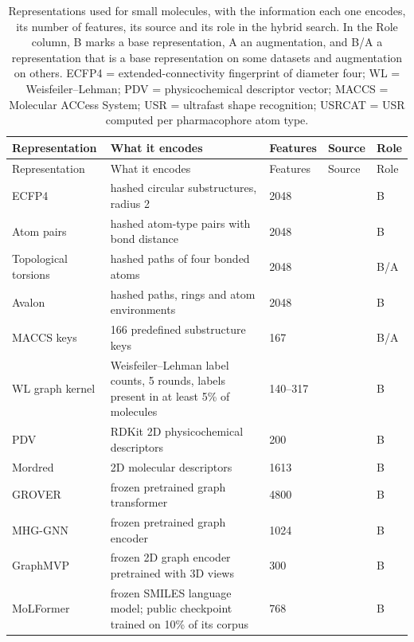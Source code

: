 \begin{longtable}{P{3.0cm}P{5.0cm}P{1.5cm}P{1.5cm}P{1.4cm}}
\caption[Representations used for small molecules.]{Representations used for small molecules, with the information each one encodes, its number of features, its source and its role in the hybrid search. In the Role column, B marks a base representation, A an augmentation, and B/A a representation that is a base representation on some datasets and augmentation on others. ECFP4 = extended-connectivity fingerprint of diameter four; WL = Weisfeiler--Lehman; PDV = physicochemical descriptor vector; MACCS = Molecular ACCess System; USR = ultrafast shape recognition; USRCAT = USR computed per pharmacophore atom type.}\label{tab:reps_smallmol}\\
\toprule
Representation & What it encodes & Features & Source & Role \\
\midrule
\endfirsthead
\toprule
Representation & What it encodes & Features & Source & Role \\
\midrule
\endhead
\bottomrule
\endfoot
ECFP4 & hashed circular substructures, radius 2 & 2048 & \citep{rogers2010} & B \\
Atom pairs & hashed atom-type pairs with bond distance & 2048 & \citep{Carhart1985} & B \\
Topological torsions & hashed paths of four bonded atoms & 2048 & \citep{Nilakantan1987} & B/A \\
Avalon & hashed paths, rings and atom environments & 2048 & \citep{Gedeck2006} & B \\
MACCS keys & 166 predefined substructure keys & 167 & \citep{Durant2002} & B/A \\
WL graph kernel & Weisfeiler--Lehman label counts, 5 rounds, labels present in at least 5\% of molecules & 140--317 & \citep{Shervashidze2011} & B \\
PDV & RDKit 2D physicochemical descriptors & 200 & \citep{rdkit} & B \\
Mordred & 2D molecular descriptors & 1613 & \citep{Moriwaki2018} & B \\
GROVER & frozen pretrained graph transformer & 4800 & \citep{Rong2020GROVER} & B \\
MHG-GNN & frozen pretrained graph encoder & 1024 & \citep{kishimoto2023} & B \\
GraphMVP & frozen 2D graph encoder pretrained with 3D views & 300 & \citep{Liu2022GraphMVP} & B \\
MoLFormer & frozen SMILES language model; public checkpoint trained on 10\% of its corpus & 768 & \citep{ross2022} & B \\

\end{longtable}
